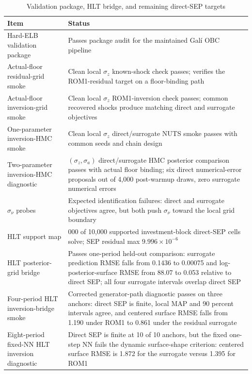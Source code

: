\documentclass[12pt]{article}
\theoremstyle{plain}
\theoremstyle{definition}
\theoremstyle{remark}
\begin{document}
\begin{table}[htbp]
\centering
\caption{Validation package, HLT bridge, and remaining direct-SEP targets}
\label{tab:param_recovery}
\small
\begin{tabular}{>{\raggedright\arraybackslash}p{}>{\raggedright\arraybackslash}p{}}
\toprule
Item & Status \\
\midrule
Hard-ELB validation package & Passes package audit for the maintained Gal\'i OBC pipeline \\
Actual-floor residual-grid smoke & Clean local $\sigma_z$ known-shock check passes; verifies the ROM1-residual target on a floor-binding path \\
Actual-floor inversion-grid smoke & Clean local $\sigma_z$ ROM1-inversion check passes; common recovered shocks produce matching direct and surrogate objectives \\
One-parameter inversion-HMC smoke & Clean local $\sigma_z$ direct/surrogate NUTS smoke passes with common seeds and chain design \\
Two-parameter inversion-HMC diagnostic & $(\sigma_z,\sigma_a)$ direct/surrogate HMC posterior comparison passes with actual floor binding; six direct numerical-error proposals out of 4,000 post-warmup draws, zero surrogate numerical errors \\
$\sigma_\nu$ probes & Expected identification failures: direct and surrogate objectives agree, but both push $\sigma_\nu$ toward the local grid boundary \\
HLT support map & 10{,}000 of 10{,}000 supported investment-block direct-SEP cells solve; SEP residual max $9.996\times 10^{-6}$ \\
HLT posterior-grid bridge & Passes one-period held-out comparison: surrogate prediction RMSE falls from 0.1436 to 0.00075 and log-posterior-surface RMSE from 88.07 to 0.053 relative to direct SEP; all four surrogate intervals overlap direct SEP \\
Four-period HLT inversion-bridge smoke & Corrected generator-path diagnostic passes on three anchors: direct SEP is finite, local MAP and 90 percent intervals agree, and centered surface RMSE falls from 1.190 under ROM1 to 0.861 under the residual surrogate \\
Eight-period fixed-NN HLT inversion diagnostic & Direct SEP is finite at 10 of 10 anchors, but the fixed one-step NN fails the dynamic surface-shape criterion: centered surface RMSE is 1.872 for the surrogate versus 1.395 for ROM1 \\

\end{tabular}
\end{table}
\end{document}

